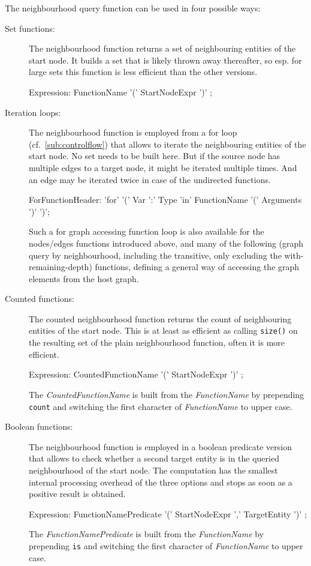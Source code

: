 The neighbourhood query function can be used in four possible ways: 
\begin{description}
	\item[Set functions:] The neighbourhood function returns a set of neighbouring entities of the start node. It builds a set that is likely thrown away thereafter, so esp. for large sets this function is less efficient than the other versions.
\begin{rail}
Expression:
  FunctionName '(' StartNodeExpr ')' ;
\end{rail}

	\item[Iteration loops:] The neighbourhood function is employed from a for loop (cf.~\ref{sub:controlflow}) that allows to iterate the neighbouring entities of the start node. No set needs to be built here. But if the source node has multiple edges to a target node, it might be iterated multiple times. And an edge may be iterated twice in case of the undirected functions.
\begin{rail}
  ForFunctionHeader: 'for' '(' Var ':' Type 'in' FunctionName '(' Arguments ')' ')';
\end{rail}
Such a for graph accessing function loop is also available for the nodes/edges functions introduced above,
and many of the following (graph query by neighbourhood, including the transitive, only excluding the with-remaining-depth) functions, defining a general way of accessing the graph elements from the host graph.

	\item[Counted functions:] The counted neighbourhood function returns the count of neighbouring entities of the start node. This is at least as efficient as calling \texttt{size()} on the resulting set of the plain neighbourhood function, often it is more efficient.
\begin{rail}
Expression:
  CountedFunctionName '(' StartNodeExpr ')' ;
\end{rail}
The \emph{CountedFunctionName} is built from the \emph{FunctionName} by prepending \texttt{count} and switching the first character of \emph{FunctionName} to upper case.

	\item[Boolean functions:] The neighbourhood function is employed in a boolean predicate version that allows to check whether a second target entity is in the queried neighbourhood of the start node. The computation has the smallest internal processing overhead of the three options and stops as soon as a positive result is obtained.
\begin{rail}
Expression:
  FunctionNamePredicate '(' StartNodeExpr ',' TargetEntity ')' ;
\end{rail}
The \emph{FunctionNamePredicate} is built from the \emph{FunctionName} by prepending \texttt{is} and switching the first character of \emph{FunctionName} to upper case.
\end{description}


